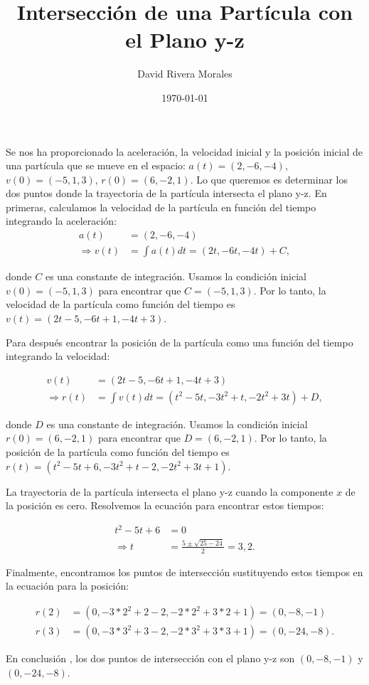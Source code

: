 \documentclass{article}
\begin{document}
\title{Intersección de una Partícula con el Plano y-z}
\author{David Rivera Morales}
\date{\today}

\maketitle

Se nos ha proporcionado la aceleración, la velocidad inicial y la posición inicial de una partícula que se mueve en el espacio: $a(t) = (2, -6, -4)$, $v(0) = (-5, 1, 3)$, $r(0) = (6, -2, 1)$. Lo que queremos es determinar los dos puntos donde la trayectoria de la partícula intersecta el plano y-z.
En primeras, calculamos la velocidad de la partícula en función del tiempo integrando la aceleración:
\begin{align*}
a(t) &= (2, -6, -4) \\
\Rightarrow v(t) &= \int a(t) dt = (2t, -6t, -4t) + C,
\end{align*}

donde $C$ es una constante de integración. Usamos la condición inicial $v(0) = (-5, 1, 3)$ para encontrar que $C = (-5, 1, 3)$. Por lo tanto, la velocidad de la partícula como función del tiempo es $v(t) = (2t-5, -6t+1, -4t+3)$.

Para después encontrar la posición de la partícula como una función del tiempo integrando la velocidad:

\begin{align*}
v(t) &= (2t-5, -6t+1, -4t+3) \\
\Rightarrow r(t) &= \int v(t) dt = (t^2 - 5t, -3t^2 + t, -2t^2 + 3t) + D,
\end{align*}

donde $D$ es una constante de integración. Usamos la condición inicial $r(0) = (6, -2, 1)$ para encontrar que $D = (6, -2, 1)$. Por lo tanto, la posición de la partícula como función del tiempo es $r(t) = (t^2 - 5t + 6, -3t^2 + t - 2, -2t^2 + 3t + 1)$.

La trayectoria de la partícula intersecta el plano y-z cuando la componente $x$ de la posición es cero. Resolvemos la ecuación para encontrar estos tiempos:

\begin{align*}
t^2 - 5t + 6 &= 0 \\
\Rightarrow t &= \frac{5 \pm \sqrt{25 - 24}}{2} = 3, 2.
\end{align*}

Finalmente, encontramos los puntos de intersección sustituyendo estos tiempos en la ecuación para la posición:

\begin{align*}
r(2) &= (0, -3*2^2 + 2 - 2, -2*2^2 + 3*2 + 1) = (0, -8, -1) \\
r(3) &= (0, -3*3^2 + 3 - 2, -2*3^2 + 3*3 + 1) = (0, -24, -8).
\end{align*}

En conclusión , los dos puntos de intersección con el plano y-z son $(0, -8, -1)$ y $(0, -24, -8)$.
\end{document}
